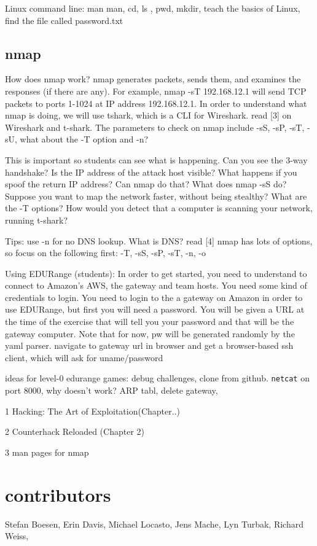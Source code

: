 \documentclass[11pt]{report}
\begin{document}
Linux command line: man man, cd, ls , pwd, mkdir, 
teach the basics of Linux, find the file called password.txt

\subsection{nmap}
 How does nmap work?
nmap generates packets, sends them, and examines the responses (if there are any).
For example, nmap -sT 192.168.12.1  will send TCP packets to ports 1-1024 at IP address 192.168.12.1.
In order to understand what nmap is doing, we will use tshark, which is a CLI for Wireshark.
read [3] on Wireshark and t-shark.  The parameters to check on nmap include 
-sS, -sP, -sT, -sU, what about the -T option and -n?

This is important so students can see what is happening.
Can you see the 3-way handshake?  Is the IP address of the attack host visible?
What happens if you spoof the return IP address?  Can nmap do that?
What does nmap -sS do?
Suppose you want to map the network faster, without being stealthy?  What are the -T options?
How would you detect that a computer is scanning your network, running t-shark?

Tips: use -n for no DNS lookup.  What is DNS? read [4]
nmap has lots of options, so focus on the following first: -T, -sS, -sP, -sT, -n, -o


Using EDURange (students): 
In order to get started, you need to understand to connect to Amazon's AWS, the gateway and team hosts.
You need some kind of credentials to login.  You need to login to the a gateway on Amazon in order to use 
EDURange, but first you will need a password.  You will be given a URL at the time of the exercise that will 
tell you your password and that will be the gateway computer.
Note that for now, pw will be generated randomly by the yaml parser.
navigate to gateway url in browser and get a browser-based ssh client,  which will ask for uname/password

ideas for level-0 edurange games: debug challenges, clone from github.  {\tt netcat} on port 8000, why doesn't work? 
ARP tabl, delete gateway,






1 Hacking: The Art of Exploitation(Chapter..)

2 Counterhack Reloaded (Chapter 2)

3 man pages for nmap


\section*{contributors}
Stefan Boesen, Erin Davis, Michael Locasto, Jens Mache,  Lyn Turbak, Richard Weiss, 

%
%
\end{document}
